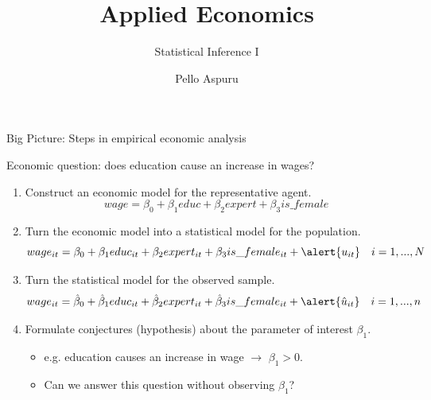\documentclass[11pt, aspectratio = 169]{beamer}
\title{Applied Economics}
\subtitle{Statistical Inference I}
\author{Pello Aspuru}
\date{}
\institute{Winter 2025/26}
\begin{document}
%

\maketitle

\begin{frame}{Big Picture: Steps in empirical economic analysis}
    \begin{center}
        Economic question: does education \alert{cause} an increase in wages?
    \end{center}
    \vspace{-3mm}
\pause
\vspace{+0.2cm}
\begin{enumerate}
    \item Construct an economic model for the \alert{representative agent}.
        $$wage = \beta_0 + \beta_1 educ + \beta_2 expert + \beta_3 is\_female $$
    \vspace{-4mm}
    \item Turn the economic model into a statistical model for the \alert{population}.
        $$wage_{it} = \beta_0 + \beta_1 educ_{it} + \beta_2 expert_{it} + \beta_3 is\_female_{it} + \alert{u_{it}} \quad i=1,...,N$$
    \pause
    \vspace{-4mm}
    \item Turn the statistical model for the \alert{observed sample}.
        $$wage_{it} = \hat{\beta}_0 + \hat{\beta}_1 educ_{it} + \hat{\beta}_2 expert_{it} + \hat{\beta}_3 is\_female_{it} + \alert{\hat{u}_{it}} \quad i=1,...,n$$
    \pause
    \vspace{-4mm}
    \item Formulate conjectures (hypothesis) about the parameter of interest $\beta_1$. 
    \begin{itemize}
        \item e.g. education causes an increase in wage $\rightarrow$ $\beta_1 >0$. 
        \item Can we answer this question without observing $\beta_1$?  
    \end{itemize}
\end{enumerate}
\end{frame}
\end{document}
